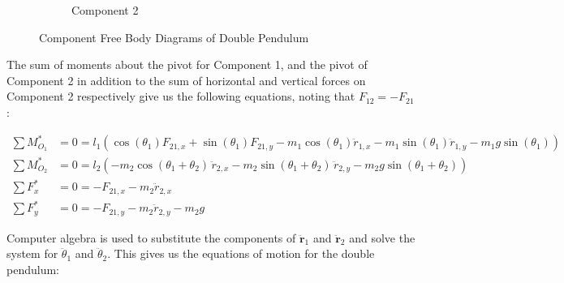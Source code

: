 \documentclass{article}
\begin{document}
\begin{figure}[h]
\begin{subfigure}{0.49\textwidth}
        \caption{Component 2}
    \end{subfigure}
    \caption{Component Free Body Diagrams of Double Pendulum}
    \label{fig:double pendulum fbds}
\end{figure}

The sum of moments about the pivot for Component 1, and the pivot of Component 2 in addition to the sum of horizontal and vertical forces on Component 2 respectively give us the following equations, noting that $F_{12} = - F_{21}$:

\begin{align*}
    \sum M^*_{O_1} &= 0 =
    l_1 \left(
        \cos(\theta_1) F_{21,x}
        + \sin(\theta_1) F_{21,y}
        - m_1 \cos(\theta_1) \ddot{r}_{1,x}
        - m_1 \sin(\theta_1) \ddot{r}_{1,y}
        - m_1 g \sin(\theta_1)
    \right) \\[2mm]
    \sum M^*_{O_2} &= 0 =
    l_2 \left(
        - m_2 \cos(\theta_1+\theta_2)\, \ddot r_{2,x}
        - m_2 \sin(\theta_1+\theta_2)\, \ddot r_{2,y}
        - m_2 g \sin(\theta_1+\theta_2)
    \right) \\[2mm]
    \sum F^*_{x} &= 0 =
    - F_{21,x}
    - m_2 \ddot r_{2,x} \\[2mm]
    \sum F^*_{y} &= 0 =
    - F_{21,y}
    - m_2 \ddot r_{2,y}
    - m_2 g
\end{align*}

Computer algebra is used to substitute the components of $\ddot{\mathbf{r}}_1$ and $\ddot{\mathbf{r}}_2$ and solve the system for $\ddot{\theta}_1$ and $\ddot{\theta}_2$. This gives us the equations of motion for the double pendulum:
\end{document}
